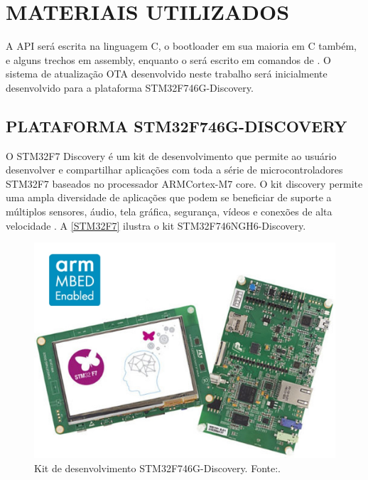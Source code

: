 \section{MATERIAIS UTILIZADOS}

A API será escrita na linguagem C, o bootloader em sua maioria em C também, e alguns trechos em assembly, enquanto o \linker será escrito em comandos de \linker. O sistema de atualização OTA desenvolvido neste trabalho será inicialmente desenvolvido para a plataforma STM32F746G-Discovery.

\subsection{PLATAFORMA STM32F746G-DISCOVERY}

O STM32F7 Discovery é um kit de desenvolvimento que permite ao usuário desenvolver e compartilhar aplicações com toda a série de microcontroladores STM32F7 baseados no processador ARM\textregistered  Cortex\textregistered-M7 core.
O kit discovery permite uma ampla diversidade de aplicações que podem se beneficiar de suporte a múltiplos sensores, áudio, tela gráfica, segurança, vídeos e conexões de alta velocidade \cite{STM32F7}.
A \autoref{STM32F7} ilustra o kit STM32F746NGH6-Discovery.

\begin{figure}[H]
    \scriptsize
     \centering
     \includegraphics[scale=0.4]{dados/figuras/STM32F7.jpg}
     \caption{Kit de desenvolvimento STM32F746G-Discovery. \newline Fonte:\cite{STM32F7}.}
     \label{STM32F7}
\end{figure}

